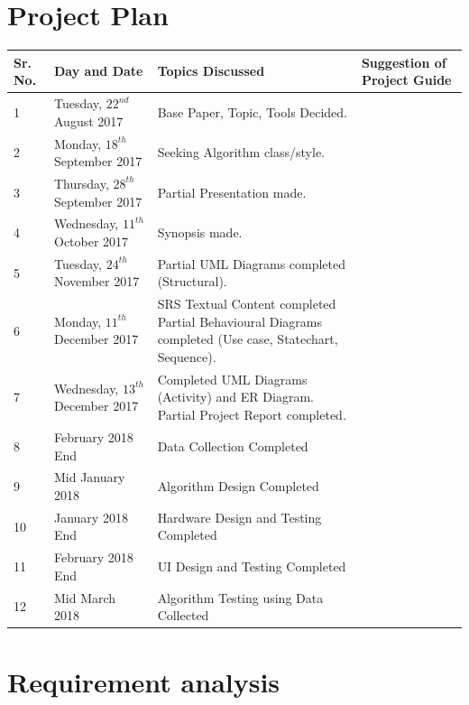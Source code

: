 \documentclass[twoside,a4paper,12pt]{book}
\begin{document}
\section{Project Plan}
\begin{table}[!ht]
	\centering
	\begin{tabular}{| p{0.7cm} | p{2.8cm} | p{7cm} | p{3cm} |}
		\toprule
		Sr. No. & Day and Date & Topics Discussed & Suggestion of Project Guide \\
		\midrule
		1 & Tuesday, $22^{nd}$ August 2017 & Base Paper, Topic, Tools Decided. & \\
		2 & Monday, $18^{th}$ September 2017 & Seeking Algorithm class/style. & \\
		3 & Thursday, $28^{th}$ September 2017 & Partial Presentation made. & \\
		4 & Wednesday, $11^{th}$ October 2017 & Synopsis made. & \\
		5 & Tuesday, $24^{th}$ November 2017 & Partial UML Diagrams completed (Structural). & \\
		6 & Monday, $11^{th}$ December 2017 & SRS Textual Content completed Partial Behavioural Diagrams completed (Use case, Statechart, Sequence). & \\
		7 & Wednesday, $13^{th}$ December 2017 & Completed UML Diagrams (Activity) and ER Diagram. Partial Project Report completed. & \\
        8 & February 2018 End & Data Collection Completed & \\
        9 & Mid January 2018 & Algorithm Design Completed & \\
        10 & January 2018 End & Hardware Design and Testing Completed & \\
        11 & February 2018 End & UI Design and Testing Completed & \\
        12 & Mid March 2018 & Algorithm Testing using Data Collected & \\
		\bottomrule
	\end{tabular}
\end{table}


\newpage
\section{Requirement analysis}
\end{document}
